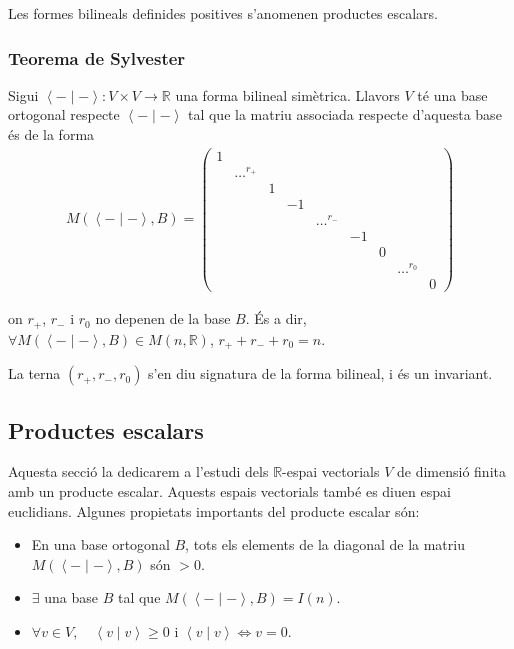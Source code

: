 Les formes bilineals definides positives s'anomenen productes escalars.

\subsubsection*{Teorema de Sylvester}
Sigui $\left< - \mid - \right>: V \times V \to \mathbb{R}$ una forma bilineal simètrica. Llavors $V$ té una base ortogonal respecte $\left< - \mid - \right>$ tal que la matriu associada respecte d'aquesta base és de la forma
\begin{align}
M(\left< - \mid - \right>, B) = 
\begin{pmatrix}
    1 & & & & & & & & \\
    & \dots^{r_{+}} & & & & & & & \\
    & & 1 & & & & & & \\
    & & & -1 & & & & & \\
    & & & & \dots^{r_{-}} & & & & \\
    & & & & & -1 & & & \\
    & & & & & & 0 & & \\
    & & & & & & & \dots^{r_{0}} & \\
    & & & & & & & & 0
\end{pmatrix}
\end{align}

on $r_{+}$, $r_{-}$ i $r_{0}$ no depenen de la base $B$. És a dir, $\forall M(\left< - \mid - \right>, B) \in M(n, \mathbb{R})$, $r_{+} + r_{-} +r_{0} = n$.

La terna $(r_{+}, r_{-}, r_{0})$ s'en diu signatura de la forma bilineal, i és un invariant.

\subsection{Productes escalars}
Aquesta secció la dedicarem a l'estudi dels $\mathbb{R}$-espai vectorials $V$ de dimensió finita amb un producte escalar. Aquests espais vectorials també es diuen espai euclidians.
Algunes propietats importants del producte escalar són:
\begin{itemize}
    \item En una base ortogonal $B$, tots els elements de la diagonal de la matriu $M(\left< - \mid - \right>, B)$ són $> 0$.
    \item $\exists$ una base $B$ tal que $M(\left< - \mid - \right>, B) = I(n)$.
    \item $\forall v \in V, \quad \left< v \mid v \right> \geq 0$ i $\left< v \mid v \right> \Leftrightarrow v = 0$.
\end{itemize}


